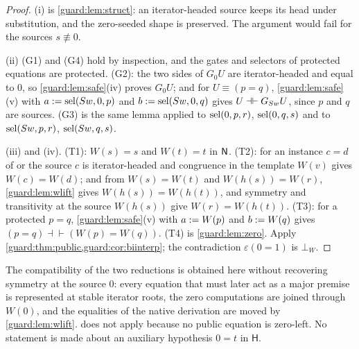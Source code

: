 \begin{proof}
(i) is \cref{guard:lem:struct}: an iterator-headed source keeps its head
under substitution, and the zero-seeded shape is preserved.  The argument
would fail for the sources $s\not\equiv 0$.

(ii) (G1) and (G4) hold by inspection, and the gates and selectors of
protected equations are protected.  (G2): the two sides of $G_0U$ are
iterator-headed and equal to $0$, so \cref{guard:lem:safe}(iv) proves
$G_0U$; and for $U\equiv(p=q)$, \cref{guard:lem:safe}(v) with
$a\mathrel{:=}\operatorname{sel}(S w,0,p)$ and $b\mathrel{:=}\operatorname{sel}(S w,0,q)$ gives
$U\dashv\vdash G_{S w}U$, since $p$ and $q$ are sources.  (G3) is the
same lemma applied to $\operatorname{sel}(0,p,r)$, $\operatorname{sel}(0,q,s)$ and to
$\operatorname{sel}(S w,p,r)$, $\operatorname{sel}(S w,q,s)$.

(iii) and (iv).  (T1): $W(s)=s$ and $W(t)=t$ in $\mathsf{N}$.  (T2): for an
instance $c=d$ of  or  the source $c$ is
iterator-headed and congruence in the template $W(v)$ gives $W(c)=W(d)$;
and from $W(s)=W(t)$ and $W(h(s))=W(r)$, \cref{guard:lem:wlift} gives
$W(h(s))=W(h(t))$, and symmetry and transitivity at the source $W(h(s))$
give $W(r)=W(h(t))$.  (T3): for a protected $p=q$,
\cref{guard:lem:safe}(v) with $a\mathrel{:=} W(p)$ and $b\mathrel{:=} W(q)$ gives
$(p=q)\dashv\vdash(W(p)=W(q))$.  (T4) is \cref{guard:lem:zero}.  Apply
\cref{guard:thm:public,guard:cor:biinterp}; the contradiction
$\varepsilon(0=1)$ is $\bot_W$.
\end{proof}

The compatibility of the two reductions is obtained here without
recovering symmetry at the source $0$: every equation that must later act
as a major premise is represented at stable iterator roots, the zero
computations are joined through $W(0)$, and the equalities of the native
derivation are moved by \cref{guard:lem:wlift}.  
does not apply because no public equation is zero-left.  No statement is
made about an auxiliary hypothesis $0=t$ in $\mathsf H$.

